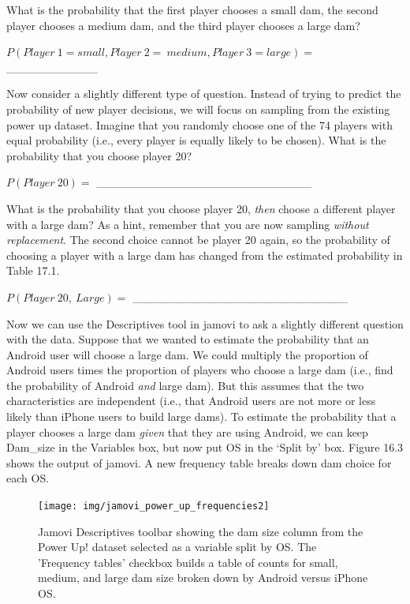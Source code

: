 \documentclass[
]{scrbook}
\begin{document}
What is the probability that the first player chooses a small dam, the second player chooses a medium dam, and the third player chooses a large dam?

\(P(Player\:1 = small,Player\:2 = \:medium,Player\:3 = large) =\) \_\_\_\_\_\_\_\_\_\_\_

Now consider a slightly different type of question.
Instead of trying to predict the probability of new player decisions, we will focus on sampling from the existing power up dataset.
Imagine that you randomly choose one of the 74 players with equal probability (i.e., every player is equally likely to be chosen).
What is the probability that you choose player 20?

\(P(Player\:20) =\) \_\_\_\_\_\_\_\_\_\_\_\_\_\_\_\_\_\_\_\_\_\_\_\_\_\_

What is the probability that you choose player 20, \emph{then} choose a different player with a large dam?
As a hint, remember that you are now sampling \emph{without replacement}.
The second choice cannot be player 20 again, so the probability of choosing a player with a large dam has changed from the estimated probability in Table 17.1.

\(P(Player\:20,\:Large) =\) \_\_\_\_\_\_\_\_\_\_\_\_\_\_\_\_\_\_\_\_\_\_\_\_\_\_

Now we can use the Descriptives tool in jamovi to ask a slightly different question with the data.
Suppose that we wanted to estimate the probability that an Android user will choose a large dam.
We could multiply the proportion of Android users times the proportion of players who choose a large dam (i.e., find the probability of Android \emph{and} large dam).
But this assumes that the two characteristics are independent (i.e., that Android users are not more or less likely than iPhone users to build large dams).
To estimate the probability that a player chooses a large dam \emph{given} that they are using Android, we can keep Dam\_size in the Variables box, but now put OS in the `Split by' box.
Figure 16.3 shows the output of jamovi.
A new frequency table breaks down dam choice for each OS.

\begin{figure}
\texttt{[image: img/jamovi\_power\_up\_frequencies2]} \caption{Jamovi Descriptives toolbar showing the dam size column from the Power Up! dataset selected as a variable split by OS. The 'Frequency tables' checkbox builds a table of counts for small, medium, and large dam size broken down by Android versus iPhone OS.}\label{fig:unnamed-chunk-72}
\end{figure}
\end{document}
